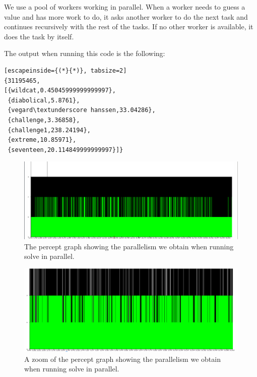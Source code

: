 \documentclass[a4paper]{article}
\begin{document}
We use a pool of workers working in parallel. When a worker needs to guess a value and has more work to do, it asks another worker to do the next task and continues recursively with the rest of the tasks. If no other worker is available, it does the task by itself.

The output when running this code is the following:
\begin{lstlisting}[escapeinside={(*}{*)}, tabsize=2]
{31195465,
[{wildcat,0.45045999999999997},
 {diabolical,5.8761},
 {vegard\textunderscore hanssen,33.04286},
 {challenge,3.36858},
 {challenge1,238.24194},
 {extreme,10.85971},
 {seventeen,20.114849999999997}]}
\end{lstlisting}

\begin{figure}[!htb]
\begin{center}
\includegraphics[scale=0.2]{Speculative_2_workers}
\caption{The percept graph showing the parallelism we obtain when running solve in parallel.}
\label{fig:solpar}
\end{center}
\end{figure}
\begin{figure}[!htb]
\begin{center}
\includegraphics[scale=0.2]{Speculative_2_workers_zoom}
\caption{A zoom of the percept graph showing the parallelism we obtain when running solve in parallel.}
\label{fig:solparzoom}
\end{center}
\end{figure}
\end{document}
